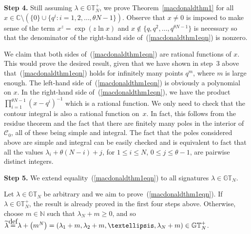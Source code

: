 \documentclass[11pt]{article}
\numberwithin{equation}{section}
\newcommand\myeq{\mathrel{\stackrel{\makebox[0pt]{\mbox{\normalfont\tiny def}}}{=}}}
\newcommand{\C}{\mathbb{C}}
\newcommand{\N}{\mathbb{N}}
\newcommand{\CC}{\mathcal{C}}
\newcommand{\GT}{\mathbb{GT}}
\newcommand{\GTp}{\mathbb{GT}^+}
\begin{document}
\textbf{Step 4.} Still assuming $\lambda\in\GTp_N$, we prove Theorem~\ref{macdonaldthm1} for all $x\in\C \setminus (\{0\}\cup\{q^i \colon i = 1, 2, \dots, \theta N - 1\})$. Observe that $x\neq 0$ is imposed to make sense of the term $x^z = \exp(z\ln{x})$ and $x\notin\{q, q^2, \dots, q^{\theta N - 1}\}$ is necessary so that the denominator of the right-hand side of~(\ref{macdonaldthm1eqn}) is nonzero.

We claim that both sides of~(\ref{macdonaldthm1eqn}) are rational functions of $x$. This would prove the desired result, given that we have shown in step~3 above that~(\ref{macdonaldthm1eqn}) holds for inf\/initely many points $q^m$, where $m$ is large enough. The left-hand side of~(\ref{macdonaldthm1eqn}) is obviously a polynomial on $x$. In the right-hand side of~(\ref{macdonaldthm1eqn}), we have the product $\prod\limits_{i=1}^{\theta N - 1}{(x - q^i)^{-1}}$ which is a rational function. We only need to check that the contour integral is also a rational function on~$x$. In fact, this follows from the residue theorem and the fact that there are f\/initely many poles in the interior of~$\CC_0$, all of these being simple and integral. The fact that the poles considered above are simple and integral can be easily checked and is equivalent to fact that all the values $\lambda_i + \theta(N - i) + j$, for $1\leq i\leq N$, $0\leq j\leq \theta - 1$, are pairwise distinct integers.

\textbf{Step 5.} We extend equality~(\ref{macdonaldthm1eqn}) to all signatures $\lambda\in\GT_N$.

Let $\lambda\in\GT_N$ be arbitrary and we aim to prove~(\ref{macdonaldthm1eqn}). If $\lambda\in\GTp_N$, the result is already proved in the f\/irst four steps above. Otherwise, choose $m\in\N$ such that $\lambda_N + m \geq 0$, and so $\widetilde{\lambda} \myeq \lambda + \big(m^N\big) = (\lambda_1 + m, \lambda_2 + m, \dots, \lambda_N + m)\in\GTp_N$.
\end{document}
